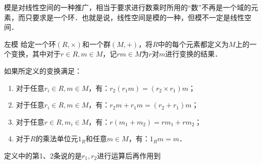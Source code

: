 

模是对线性空间的一种推广，相当于要求进行数乘时所用的“数”不再是一个域的元素，而只要求是一个环．也就是说，线性空间是模的一种，但模不一定是线性空间．

\begin{definition}{左模}
给定一个环$(R, \times)$和一个群$(M, +)$，将$R$中的每个元素都定义为$M$上的一个变换，其中对于$r\in R, m\in M$，记$rm\in M$为$r$对$m$进行变换的结果．

如果所定义的变换满足：
\begin{enumerate}
\item 对于任意$r_i\in R, m\in M$，有：$r_2(r_1m)=(r_2\times r_1)m$；
\item 对于任意$r_i\in R, m\in M$，有：$r_2m+r_1m=(r_2+r_1)m$；
\item 对于任意$r\in R, m_i\in M$，有：$r(m_1+m_2)=rm_1+rm_2$；
\item 对于$R$的乘法单位元$1_R$和任意$m\in M$，有：$1_Rm=m$．
\end{enumerate}
\end{definition}

定义中的第1、2条说的是$r_1, r_2$进行运算后再作用到









